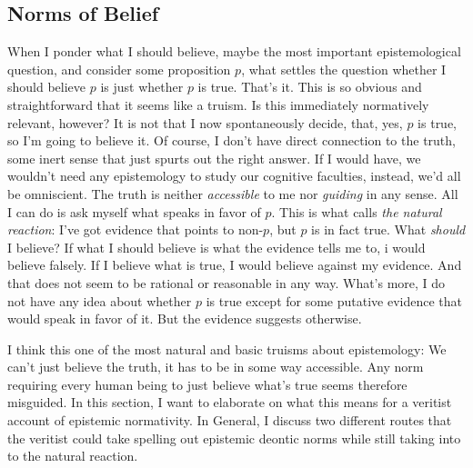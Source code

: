 \documentclass[12pt,numbers=noenddot]{scrartcl}
\begin{document}
\subsection{ Norms of Belief }\label{sec:normsofbelief}

When I ponder what I should believe, maybe the most important epistemological question, and consider some proposition $p$, what settles the question whether I should believe $p$ is just whether $p$ is true. That's it. This is so obvious and straightforward that it seems like a truism. Is this immediately normatively relevant, however? It is not that I now spontaneously decide, that, yes, $p$ is true, so I'm going to believe it. Of course, I don't have direct connection to the truth, some inert sense that just spurts out the right answer. If I would have, we wouldn't need any epistemology to study our cognitive faculties, instead, we'd all be omniscient. The truth is neither \emph{accessible} to me nor \emph{guiding} in any sense. All I can do is ask myself what speaks in favor of $p$. This is what \textcite{Gibbons2013-GIBTNO} calls \emph{the natural reaction}: I've got evidence that points to non-$p$, but $p$ is in fact true. What \emph{should} I believe? If what I should believe is what the evidence tells me to, i would believe falsely. If I believe what is true, I would believe against my evidence. And that does not seem to be rational or reasonable in any way. What's more, I do not have any idea about whether $p$ is true except for some putative evidence that would speak in favor of it. But the evidence suggests otherwise.

I think this one of the most natural and basic truisms about epistemology: We can't just believe the truth, it has to be in some way accessible. Any norm requiring every human being to just believe what's true seems therefore misguided. In this section, I want to elaborate on what this means for a veritist account of epistemic normativity. In General, I discuss two different routes that the veritist could take spelling out epistemic deontic norms while still taking into to the natural reaction.
\end{document}
